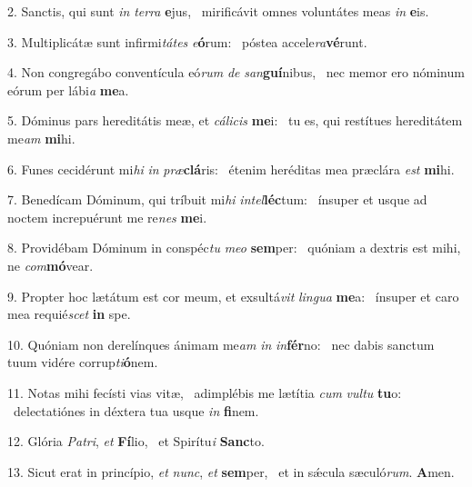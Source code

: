 2. Sanctis, qui sunt \textit{in} \textit{ter}\textit{ra} \textbf{e}jus, \ast\  mirificávit omnes voluntátes meas \textit{in} \textbf{e}is.\

3. Multiplicátæ sunt infirmi\textit{tá}\textit{tes} \textit{e}\textbf{ó}rum: \ast\  póstea accele\textit{ra}\textbf{vé}runt.\

4. Non congregábo conventícula eó\textit{rum} \textit{de} \textit{san}\textbf{guí}nibus, \ast\  nec memor ero nóminum eórum per lábi\textit{a} \textbf{me}a.\

5. Dóminus pars hereditátis meæ, et \textit{cá}\textit{li}\textit{cis} \textbf{me}i: \ast\  tu es, qui restítues hereditátem me\textit{am} \textbf{mi}hi.\

6. Funes cecidérunt mi\textit{hi} \textit{in} \textit{præ}\textbf{clá}ris: \ast\  étenim heréditas mea præclára \textit{est} \textbf{mi}hi.\

7. Benedícam Dóminum, qui tríbuit mi\textit{hi} \textit{in}\textit{tel}\textbf{léc}tum: \ast\  ínsuper et usque ad noctem increpuérunt me re\textit{nes} \textbf{me}i.\

8. Providébam Dóminum in conspéc\textit{tu} \textit{me}\textit{o} \textbf{sem}per: \ast\  quóniam a dextris est mihi, ne \textit{com}\textbf{mó}vear.\

9. Propter hoc lætátum est cor meum, et exsultá\textit{vit} \textit{lin}\textit{gua} \textbf{me}a: \ast\  ínsuper et caro mea requié\textit{scet} \textbf{in} spe.\

10. Quóniam non derelínques ánimam me\textit{am} \textit{in} \textit{in}\textbf{fér}no: \ast\  nec dabis sanctum tuum vidére corrup\textit{ti}\textbf{ó}nem.\

11. Notas mihi fecísti vias vitæ, \dag\  adimplébis me lætítia \textit{cum} \textit{vul}\textit{tu} \textbf{tu}o: \ast\  delectatiónes in déxtera tua usque \textit{in} \textbf{fi}nem.\

12. Glória \textit{Pa}\textit{tri}, \textit{et} \textbf{Fí}lio, \ast\  et Spirítu\textit{i} \textbf{Sanc}to.\

13. Sicut erat in princípio, \textit{et} \textit{nunc}, \textit{et} \textbf{sem}per, \ast\  et in sǽcula sæculó\textit{rum}. \textbf{A}men.\

